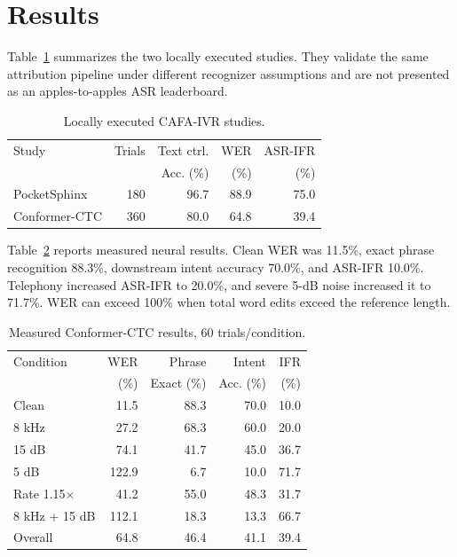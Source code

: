 \documentclass[9pt,twocolumn]{extarticle}
\begin{document}
\section{Results}
Table~\ref{tab:studies} summarizes the two locally executed studies. They validate the same attribution pipeline under different recognizer assumptions and are not presented as an apples-to-apples ASR leaderboard.

\begin{table}[t]
\caption{Locally executed CAFA-IVR studies.}
\label{tab:studies}
\centering\scriptsize
\begin{tabular}{lrrrr}
\toprule
Study & Trials & Text ctrl. & WER & ASR-IFR\\
 & & Acc. (\%) & (\%) & (\%)\\
\midrule
PocketSphinx & 180 & 96.7 & 88.9 & 75.0\\
Conformer-CTC & 360 & 80.0 & 64.8 & 39.4\\
\bottomrule
\end{tabular}
\end{table}

Table~\ref{tab:neural} reports measured neural results. Clean WER was 11.5\%, exact phrase recognition 88.3\%, downstream intent accuracy 70.0\%, and ASR-IFR 10.0\%. Telephony increased ASR-IFR to 20.0\%, and severe 5-dB noise increased it to 71.7\%. WER can exceed 100\% when total word edits exceed the reference length.

\begin{table}[t]
\caption{Measured Conformer-CTC results, 60 trials/condition.}
\label{tab:neural}
\centering\scriptsize
\begin{tabular}{lrrrr}
\toprule
Condition & WER & Phrase & Intent & IFR\\
 & (\%) & Exact (\%) & Acc. (\%) & (\%)\\
\midrule
Clean & 11.5 & 88.3 & 70.0 & 10.0\\
8 kHz & 27.2 & 68.3 & 60.0 & 20.0\\
15 dB & 74.1 & 41.7 & 45.0 & 36.7\\
5 dB & 122.9 & 6.7 & 10.0 & 71.7\\
Rate 1.15$\times$ & 41.2 & 55.0 & 48.3 & 31.7\\
8 kHz + 15 dB & 112.1 & 18.3 & 13.3 & 66.7\\
\midrule
Overall & 64.8 & 46.4 & 41.1 & 39.4\\
\bottomrule
\end{tabular}
\end{table}
\end{document}
